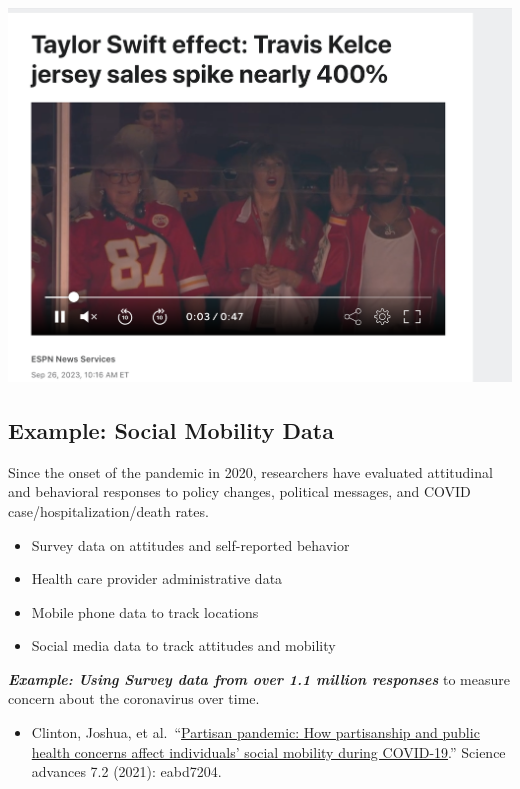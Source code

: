 \documentclass[
  letterpaper,
  DIV=11,
  numbers=noendperiod]{scrreprt}
\providecommand{\tightlist}{%
  \setlength{\itemsep}{0pt}\setlength{\parskip}{0pt}}\usepackage{longtable,booktabs,array}
\begin{document}
\includegraphics{images/kelce.png}

\hypertarget{example-social-mobility-data}{%
\subsection{Example: Social Mobility
Data}\label{example-social-mobility-data}}

Since the onset of the pandemic in 2020, researchers have evaluated
attitudinal and behavioral responses to policy changes, political
messages, and COVID case/hospitalization/death rates.

\begin{itemize}
\tightlist
\item
  Survey data on attitudes and self-reported behavior
\item
  Health care provider administrative data
\item
  Mobile phone data to track locations
\item
  Social media data to track attitudes and mobility
\end{itemize}

\textbf{\emph{Example: Using Survey data from over 1.1 million
responses}} to measure concern about the coronavirus over time.

\begin{itemize}
\tightlist
\item
  Clinton, Joshua, et
  al.~``\href{https://www.science.org/doi/10.1126/sciadv.abd7204}{Partisan
  pandemic: How partisanship and public health concerns affect
  individuals' social mobility during COVID-19}.'' Science advances 7.2
  (2021): eabd7204.
\end{itemize}
\end{document}
